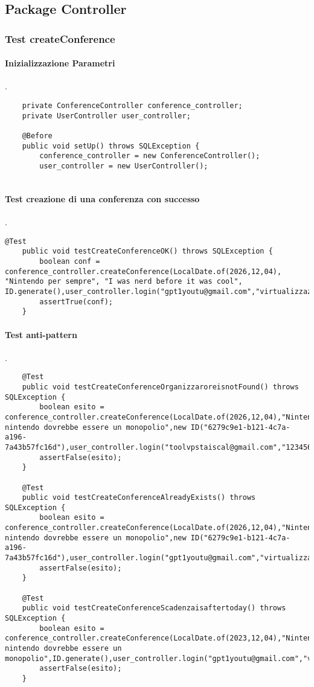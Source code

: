 \subsection{Package Controller}
\label{sec:test_unita_package_controller}

\subsubsection{Test createConference}
\paragraph{Inizializzazione Parametri}
.
\begin{lstlisting}
    private ConferenceController conference_controller;
    private UserController user_controller;

    @Before
    public void setUp() throws SQLException {
        conference_controller = new ConferenceController();
        user_controller = new UserController();
    
\end{lstlisting}
\paragraph{Test creazione di una conferenza con successo}
.
\begin{lstlisting}
@Test
    public void testCreateConferenceOK() throws SQLException {
        boolean conf = conference_controller.createConference(LocalDate.of(2026,12,04), "Nintendo per sempre", "I was nerd before it was cool", ID.generate(),user_controller.login("gpt1youtu@gmail.com","virtualizzazione"));
        assertTrue(conf);
    }
\end{lstlisting}
\paragraph{Test anti-pattern }
.
\begin{lstlisting}
    @Test
    public void testCreateConferenceOrganizzaroreisnotFound() throws SQLException {
        boolean esito = conference_controller.createConference(LocalDate.of(2026,12,04),"Nintendo","Perche nintendo dovrebbe essere un monopolio",new ID("6279c9e1-b121-4c7a-a196-7a43b57fc16d"),user_controller.login("toolvpstaiscal@gmail.com","12345678!"));
        assertFalse(esito);
    }

    @Test
    public void testCreateConferenceAlreadyExists() throws SQLException {
        boolean esito = conference_controller.createConference(LocalDate.of(2026,12,04),"Nintendo","Perche nintendo dovrebbe essere un monopolio",new ID("6279c9e1-b121-4c7a-a196-7a43b57fc16d"),user_controller.login("gpt1youtu@gmail.com","virtualizzazione"));
        assertFalse(esito);
    }

    @Test
    public void testCreateConferenceScadenzaisaftertoday() throws SQLException {
        boolean esito = conference_controller.createConference(LocalDate.of(2023,12,04),"Nintendo","Perche nintendo dovrebbe essere un monopolio",ID.generate(),user_controller.login("gpt1youtu@gmail.com","virtualizzazione"));
        assertFalse(esito);
    }
\end{lstlisting}

